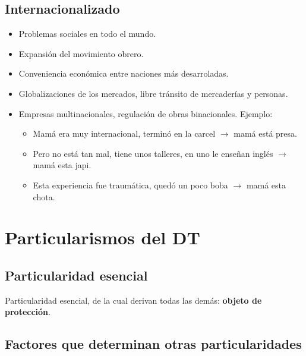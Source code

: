 \documentclass[spanish,12pt,a4paper,titlepage]{report}
\begin{document}
\subsection{Internacionalizado}
\label{sec:internacionalizado}

\begin{itemize}
\item Problemas sociales en todo el mundo.
\item Expansión del movimiento obrero.
\item Conveniencia económica entre naciones más desarroladas.
\item Globalizaciones de los mercados, libre tránsito de mercaderías y personas.
\item Empresas multinacionales, regulación de obras binacionales.
  Ejemplo:
  \begin{itemize}
  \item Mamá era muy internacional, terminó en la carcel $\rightarrow$ mamá está presa.
  \item Pero no está tan mal, tiene unos talleres, en uno le enseñan inglés $\rightarrow$ mamá esta japi.
  \item Esta experiencia fue traumática, quedó un poco boba $\rightarrow$ mamá esta chota.
  \end{itemize}
\end{itemize}



\section{Particularismos del DT}
\label{sec:particularismos-del-dt}

\subsection{Particularidad esencial}
\label{sec:particularidad-esencial}

Particularidad esencial, de la cual derivan todas las demás: \textbf{objeto de protección}.

\subsection{Factores que determinan otras particularidades}
\label{sec:factores-que-determinan-otras-particularidades}
\end{document}
